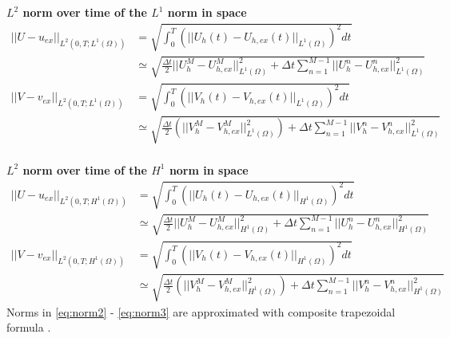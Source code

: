 \textbf{ $L^2$ norm over time of the $L^1$ norm in space}
\begin{equation}\label{eq:norm2}\begin{aligned}
  ||U-u_{ex}||_{L^2\left(0, T; L^1\left(\Omega\right) \right)} & = \sqrt{\int_0^{T} \left( ||U_h(t)-U_{h,ex}(t)||_{L^1\left(\Omega\right)} \right)^2 dt} \\ & \simeq \sqrt{ \frac{\Delta t}{2} ||U_h^M- U_{h,ex}^M||_{L^1\left(\Omega\right)}^2 + \Delta t \sum_{n = 1}^{M-1} ||U_h^n - U_{h, ex}^n||_{L^1\left(\Omega\right)}^2 } \\
  ||V-v_{ex}||_{L^2\left(0, T; L^1\left(\Omega\right) \right)} & = \sqrt {\int_0^{T} \left(||V_h(t)-V_{h,ex}(t)||_{L^1\left(\Omega\right)}\right)^2 dt }\\ & \simeq \sqrt{ \frac{\Delta t}{2} \left( ||V_h^M- V_{h,ex}^M||_{L^1\left(\Omega\right)}^2 \right) + \Delta t \sum_{n = 1}^{M-1} ||V_h^n - V_{h, ex}^n||_{L^1\left(\Omega\right)}^2} \\
\end{aligned} \end{equation}

\textbf{$L^2$ norm over time of the $H^1$ norm in space}
\begin{equation}\label{eq:norm3}\begin{aligned}
  ||U-u_{ex}||_{L^2\left(0, T; H^1\left(\Omega\right) \right)} & = \sqrt{\int_0^{T} \left( ||U_h(t)-U_{h,ex}(t)||_{H^1\left(\Omega\right)} \right)^2 dt} \\ & \simeq \sqrt{ \frac{\Delta t}{2} ||U_h^M- U_{h,ex}^M||_{H^1\left(\Omega\right)}^2 + \Delta t \sum_{n = 1}^{M-1} ||U_h^n - U_{h, ex}^n||_{H^1\left(\Omega\right)}^2 } \\
  ||V-v_{ex}||_{L^2\left(0, T; H^1\left(\Omega\right) \right)} & = \sqrt {\int_0^{T} \left(||V_h(t)-V_{h,ex}(t)||_{H^1\left(\Omega\right)}\right)^2 dt }\\ & \simeq \sqrt{ \frac{\Delta t}{2} \left( ||V_h^M- V_{h,ex}^M||_{H^1\left(\Omega\right)}^2 \right) + \Delta t \sum_{n = 1}^{M-1} ||V_h^n - V_{h, ex}^n||_{H^1\left(\Omega\right)}^2}
\end{aligned} \end{equation}
Norms in \eqref{eq:norm2} - \eqref{eq:norm3} are approximated with composite trapezoidal formula \cite{NM:Quarteroni}.


